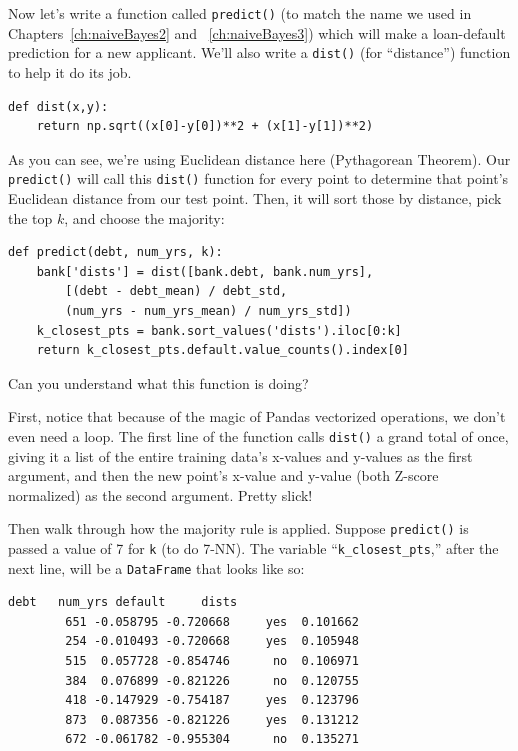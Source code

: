 
Now let's write a function called \texttt{predict()} (to match the name we used
in Chapters~\ref{ch:naiveBayes2} and ~\ref{ch:naiveBayes3}) which will make a
loan-default prediction for a new applicant. We'll also write a \texttt{dist()}
(for ``distance'') function to help it do its job.


\begin{Verbatim}[fontsize=\small,samepage=true,frame=single,framesep=3mm]
def dist(x,y):
    return np.sqrt((x[0]-y[0])**2 + (x[1]-y[1])**2)
\end{Verbatim}

As you can see, we're using Euclidean distance here (Pythagorean Theorem). Our
\texttt{predict()} will call this \texttt{dist()} function for every point to
determine that point's Euclidean distance from our test point. Then, it will
sort those by distance, pick the top $k$, and choose the majority:

\begin{Verbatim}[fontsize=\small,samepage=true,frame=single,framesep=3mm]
def predict(debt, num_yrs, k):
    bank['dists'] = dist([bank.debt, bank.num_yrs],
        [(debt - debt_mean) / debt_std,
        (num_yrs - num_yrs_mean) / num_yrs_std])
    k_closest_pts = bank.sort_values('dists').iloc[0:k]
    return k_closest_pts.default.value_counts().index[0]
\end{Verbatim}

Can you understand what this function is doing?


First, notice that because of the magic of Pandas vectorized operations, we
don't even need a loop. The first line of the function calls \texttt{dist()} a
grand total of once, giving it a list of the entire training data's x-values
and y-values as the first argument, and then the new point's x-value and
y-value (both Z-score normalized) as the second argument. Pretty slick!

Then walk through how the majority rule is applied. Suppose \texttt{predict()}
is passed a value of 7 for \texttt{k} (to do 7-NN). The variable
``\texttt{k\_closest\_pts},'' after the next line, will be a \texttt{DataFrame}
that looks like so:

\begin{Verbatim}[fontsize=\small,samepage=true,frame=leftline,framesep=5mm,framerule=1mm]
                 debt   num_yrs default     dists
        651 -0.058795 -0.720668     yes  0.101662
        254 -0.010493 -0.720668     yes  0.105948
        515  0.057728 -0.854746      no  0.106971
        384  0.076899 -0.821226      no  0.120755
        418 -0.147929 -0.754187     yes  0.123796
        873  0.087356 -0.821226     yes  0.131212
        672 -0.061782 -0.955304      no  0.135271
\end{Verbatim}

